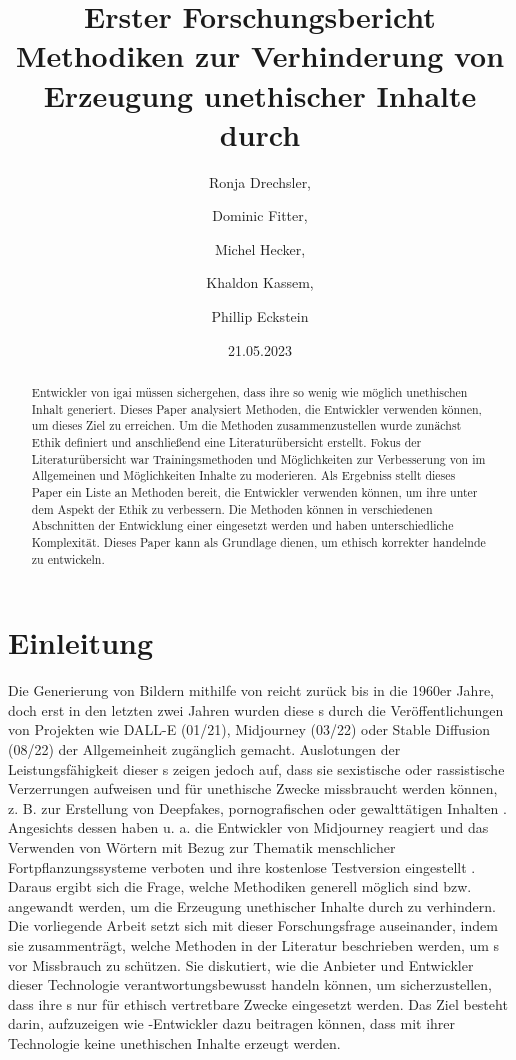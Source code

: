 \documentclass[12pt]{report}
\title{Erster Forschungsbericht \\[1ex] \large Methodiken zur Verhinderung von  Erzeugung unethischer Inhalte durch \GLSabrev{igai}}
\date{21.05.2023}
\author{Ronja Drechsler, \and Dominic Fitter, \and Michel Hecker, \and Khaldon Kassem, \and Phillip Eckstein}
\begin{document}
\maketitle
\tableofcontents
\newpage
\printnoidxglossary
\newpage

\begin{abstract}
	Entwickler von \Gls{igai} müssen sichergehen, dass ihre  so wenig wie möglich unethischen Inhalt generiert.
	Dieses Paper analysiert Methoden, die Entwickler verwenden können, um dieses Ziel zu erreichen. 
	Um die Methoden zusammenzustellen wurde zunächst Ethik definiert und anschließend eine Literaturübersicht erstellt. 
	Fokus der Literaturübersicht war Trainingsmethoden und Möglichkeiten zur Verbesserung von  im Allgemeinen und Möglichkeiten Inhalte zu moderieren. 
	Als Ergebniss stellt dieses Paper ein Liste an Methoden bereit, die Entwickler verwenden können, um ihre  unter dem Aspekt der Ethik zu verbessern. 
	Die Methoden können in verschiedenen Abschnitten der Entwicklung einer  eingesetzt werden und haben unterschiedliche Komplexität. 
	Dieses Paper kann als Grundlage dienen, um ethisch korrekter handelnde  zu entwickeln.
\end{abstract}


\chapter{Einleitung}
Die Generierung von Bildern mithilfe von  reicht zurück bis in die 1960er Jahre\cite{Garcia}, doch erst in den letzten zwei Jahren wurden diese s durch die Veröffentlichungen von Projekten wie DALL-E (01/21), Midjourney (03/22) oder Stable Diffusion (08/22) der Allgemeinheit zugänglich gemacht. Auslotungen der Leistungsfähigkeit dieser s zeigen jedoch auf, dass sie sexistische oder rassistische Verzerrungen aufweisen \cite{Schmidt} und für unethische Zwecke missbraucht werden können, z. B. zur Erstellung von Deepfakes, pornografischen oder gewalttätigen Inhalten \cite{Hadero}.
Angesichts dessen haben u. a. die Entwickler von Midjourney reagiert und das Verwenden von Wörtern mit Bezug zur Thematik menschlicher Fortpflanzungssysteme verboten \cite{Heikkilae} und ihre kostenlose Testversion eingestellt \cite{NelsonMidjourney}. Daraus ergibt sich die Frage, welche Methodiken generell möglich sind bzw. angewandt werden, um die Erzeugung unethischer Inhalte durch  zu verhindern.
Die vorliegende Arbeit setzt sich mit dieser Forschungsfrage auseinander, indem sie zusammenträgt, welche Methoden in der Literatur beschrieben werden, um s vor Missbrauch zu schützen. Sie diskutiert, wie die Anbieter und Entwickler dieser Technologie verantwortungsbewusst handeln können, um sicherzustellen, dass ihre s nur für ethisch vertretbare Zwecke eingesetzt werden. Das Ziel besteht darin, aufzuzeigen wie -Entwickler dazu beitragen können, dass mit ihrer Technologie keine unethischen Inhalte erzeugt werden.
\end{document}
